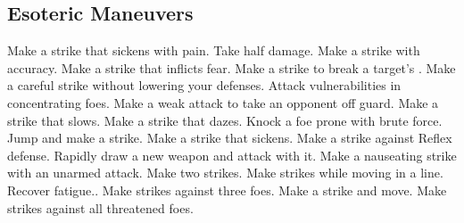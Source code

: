 
\small
\subsection{Esoteric Maneuvers}\label{Esoteric Maneuvers}
\begin{spelllist}
 Make a strike that sickens with pain.
 Take half damage.
 Make a strike with  accuracy.
 Make a strike that inflicts fear.
 Make a strike to break a target's .
 Make a careful strike without lowering your defenses.
 Attack vulnerabilities in concentrating foes.
 Make a weak attack to take an opponent off guard.
 Make a strike that slows.
 Make a strike that dazes.
 Knock a foe prone with brute force.
 Jump and make a strike.
 Make a strike that sickens.
 Make a strike against Reflex defense.
 Rapidly draw a new weapon and attack with it.
 Make a nauseating strike with an unarmed attack.
 Make two strikes.
 Make strikes while moving in a line.
 Recover fatigue..
 Make strikes against three foes.
 Make a strike and move.
 Make strikes against all threatened foes.
\end{spelllist}



\small
